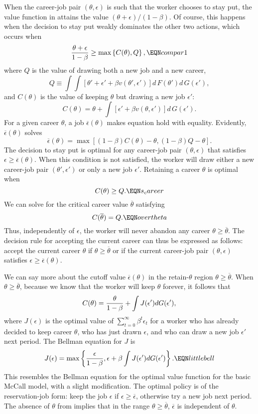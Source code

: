 When the career-job pair $(\theta, \epsilon)$ is such that the worker
chooses to stay put, the value function in  attains the
value $(\theta + \epsilon)/(1-\beta)$. Of course, this happens when
the decision to stay put weakly dominates the other two actions, which
occurs when
$$ {\theta + \epsilon \over 1 - \beta} \geq \max\left\{
 C(\theta), Q\right\}, \EQN compar1 $$
where $Q$ is the value of drawing both a new job and a new career,
$$ Q \equiv \int \int \left[ \theta' + \epsilon' +
\beta v(\theta', \epsilon')\right]
              d \, F(\theta') d \, G(\epsilon'), $$
and $C(\theta)$ is the value of keeping $\theta$ but drawing a new job $\epsilon'$:
$$C(\theta)=  \theta + \int \left[\epsilon' + \beta v(\theta, \epsilon')\right]
        d\, G(\epsilon').$$
For a given career $\theta$, a job $\overline \epsilon
(\theta) $
makes equation  hold with equality. Evidently,
$\overline \epsilon(\theta)$ solves
$$ \overline\epsilon(\theta) = \max [ (1-\beta) C(\theta) -  \theta,
  (1-\beta) Q - \theta].  $$
 The decision to stay put is optimal
for any career-job pair $(\theta, \epsilon)$ that satisfies
$\epsilon \geq \overline
\epsilon(\theta)$. When this condition is not satisfied,
the worker will  draw either a new career-job pair $(\theta', \epsilon')$ or
only a new job $\epsilon'$.
 Retaining a career $\theta$
is optimal when
$$
C(\theta)   \geq Q.          \EQN s_career
$$
We can solve  for the critical career value
$\overline \theta$ satisfying
$$ C( \overline \theta ) = Q . \EQN overtheta $$
Thus, independently of $\epsilon$, the worker will never abandon any
career $\theta \geq \overline \theta$. The decision rule for accepting
the current career can thus be expressed as  follows:
accept the current career $\theta$ if $\theta \geq \overline \theta $
or if the current career-job pair $(\theta, \epsilon)$ satisfies
$\epsilon \geq \overline \epsilon(\theta)$.

We can say more about the cutoff value $\overline \epsilon(\theta)$
in the retain-$\theta$ region $\theta  \geq \overline \theta$.
When $\theta \geq \overline \theta$, because we know that the
worker will keep $\theta$ forever, it follows that
$$ C(\theta) = {\theta \over 1 -\beta} + \int J(\epsilon')
  d G(\epsilon'), $$
where $J(\epsilon)$ is the optimal value of %
$ \sum_{t=0}^\infty \beta^t \epsilon_t$ for a worker who has already decided to keep
career $\theta$, who
has just drawn $\epsilon$,  and who can draw a new job  $\epsilon'$ next period.
The Bellman equation for $J$ is
$$ J(\epsilon) = \max \left\{ {\epsilon \over 1-\beta},
  \epsilon + \beta  \int J(\epsilon') d G(\epsilon')\right\} .
 \EQN littlebell $$
This resembles the Bellman equation for the optimal value function for the
basic McCall model, with a slight modification.
The optimal policy is of the reservation-job form: keep the job $\epsilon$
if $\epsilon \geq \overline \epsilon$, otherwise  try a new job next
period.
The absence of $\theta$ from  implies that
in the range $\theta \geq  \overline \theta$, $\overline \epsilon$
is independent of $\theta$.

